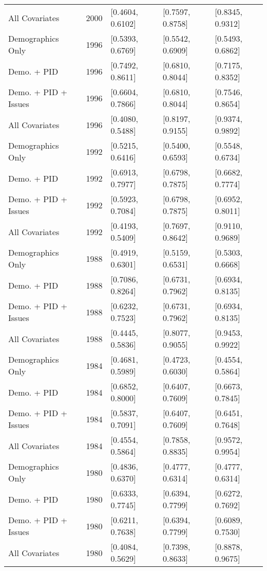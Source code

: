\begin{longtable}{lrlll}
  All Covariates & 2000 & [0.4604, 0.6102] & [0.7597, 0.8758] & [0.8345, 0.9312] \\ 
  Demographics Only & 1996 & [0.5393, 0.6769] & [0.5542, 0.6909] & [0.5493, 0.6862] \\ 
  Demo. + PID & 1996 & [0.7492, 0.8611] & [0.6810, 0.8044] & [0.7175, 0.8352] \\ 
  Demo. + PID + Issues & 1996 & [0.6604, 0.7866] & [0.6810, 0.8044] & [0.7546, 0.8654] \\ 
  All Covariates & 1996 & [0.4080, 0.5488] & [0.8197, 0.9155] & [0.9374, 0.9892] \\ 
  Demographics Only & 1992 & [0.5215, 0.6416] & [0.5400, 0.6593] & [0.5548, 0.6734] \\ 
  Demo. + PID & 1992 & [0.6913, 0.7977] & [0.6798, 0.7875] & [0.6682, 0.7774] \\ 
  Demo. + PID + Issues & 1992 & [0.5923, 0.7084] & [0.6798, 0.7875] & [0.6952, 0.8011] \\ 
  All Covariates & 1992 & [0.4193, 0.5409] & [0.7697, 0.8642] & [0.9110, 0.9689] \\ 
  Demographics Only & 1988 & [0.4919, 0.6301] & [0.5159, 0.6531] & [0.5303, 0.6668] \\ 
  Demo. + PID & 1988 & [0.7086, 0.8264] & [0.6731, 0.7962] & [0.6934, 0.8135] \\ 
  Demo. + PID + Issues & 1988 & [0.6232, 0.7523] & [0.6731, 0.7962] & [0.6934, 0.8135] \\ 
  All Covariates & 1988 & [0.4445, 0.5836] & [0.8077, 0.9055] & [0.9453, 0.9922] \\ 
  Demographics Only & 1984 & [0.4681, 0.5989] & [0.4723, 0.6030] & [0.4554, 0.5864] \\ 
  Demo. + PID & 1984 & [0.6852, 0.8000] & [0.6407, 0.7609] & [0.6673, 0.7845] \\ 
  Demo. + PID + Issues & 1984 & [0.5837, 0.7091] & [0.6407, 0.7609] & [0.6451, 0.7648] \\ 
  All Covariates & 1984 & [0.4554, 0.5864] & [0.7858, 0.8835] & [0.9572, 0.9954] \\ 
  Demographics Only & 1980 & [0.4836, 0.6370] & [0.4777, 0.6314] & [0.4777, 0.6314] \\ 
  Demo. + PID & 1980 & [0.6333, 0.7745] & [0.6394, 0.7799] & [0.6272, 0.7692] \\ 
  Demo. + PID + Issues & 1980 & [0.6211, 0.7638] & [0.6394, 0.7799] & [0.6089, 0.7530] \\ 
  All Covariates & 1980 & [0.4084, 0.5629] & [0.7398, 0.8633] & [0.8878, 0.9675] \\ 

\end{longtable}
